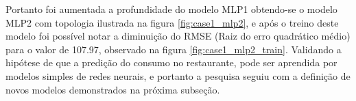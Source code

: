         Portanto foi aumentada a profundidade do modelo MLP1 obtendo-se o modelo MLP2 com topologia ilustrada na figura  \ref{fig:case1_mlp2}, e após o treino deste modelo foi possível notar a diminuição do RMSE (Raiz do erro quadrático médio) para o valor de 107.97, observado na figura \ref{fig:case1_mlp2_train}. Validando a hipótese de que a predição do consumo no restaurante, pode ser aprendida por modelos simples de redes neurais, e portanto a pesquisa seguiu com a definição de novos modelos demonstrados na próxima subseção.
        \begin{figure}[H]
        \end{figure}
        \begin{figure}[H]
        \end{figure}
